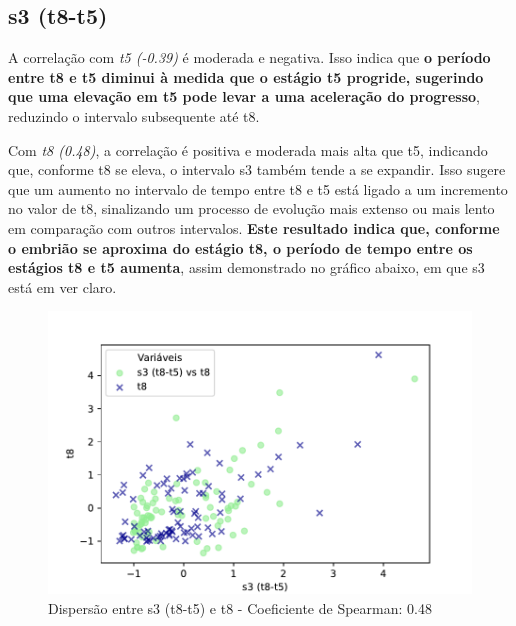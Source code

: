 \subsection*{s3 (t8-t5)}
A correlação com \textit{t5 (-0.39)} é moderada e negativa. Isso indica que \textbf{o período entre t8 e t5 diminui à medida que o estágio t5 progride, sugerindo que uma elevação em t5 pode levar a uma aceleração do progresso}, reduzindo o intervalo subsequente até t8. 

Com \textit{t8 (0.48)}, a correlação é positiva e moderada mais alta que t5, indicando que, conforme t8 se eleva, o intervalo s3 também tende a se expandir. Isso sugere que um aumento no intervalo de tempo entre t8 e t5 está ligado a um incremento no valor de t8, sinalizando um processo de evolução mais extenso ou mais lento em comparação com outros intervalos. \textbf{Este resultado indica que, conforme o embrião se aproxima do estágio t8, o período de tempo entre os estágios t8 e t5 aumenta}, assim demonstrado no gráfico abaixo, em que s3 está em ver claro. 

\begin{figure}[h]
    \captionsetup{font=footnotesize, justification=centering, labelsep=period, position=above}
    \caption{Dispersão entre s3 (t8-t5) e t8 - Coeficiente de Spearman: 0.48}
    \label{fig:s3-t8}
    \centering
    \includegraphics[scale=0.4]{figuras/Spearman/s3-t8.pdf}
    \vspace{0.3cm} 
    \begin{minipage}{\linewidth}
        \centering
    \end{minipage}
\end{figure}
\FloatBarrier

